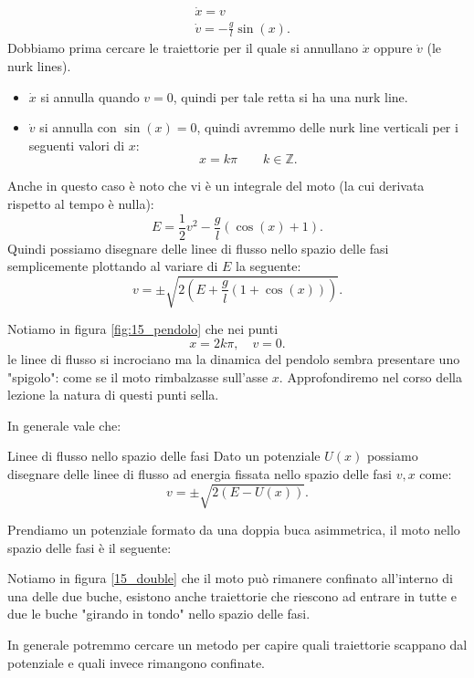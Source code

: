 \begin{exmp}[Pendolo]
    \[\begin{aligned}
	& \dot{x}=v\\
	& \dot{v}=-\frac{g}{l}\sin (x) 
    .\end{aligned}\]
    Dobbiamo prima cercare le traiettorie per il quale si annullano $\dot{x}$ oppure $\dot{v}$ (le nurk lines). 
    \begin{itemize}
        \item $\dot{x}$ si annulla quando $v = 0$, quindi per tale retta si ha una nurk line.
	\item $\dot{v}$ si annulla con $\sin (x) = 0$, quindi avremmo delle nurk line verticali per i seguenti valori di $x$: 
	    \[
		x = k\pi  \qquad k \in \mathbb{Z}
	    .\] 
    \end{itemize}
    Anche in questo caso è noto che vi è un integrale del moto (la cui derivata rispetto al tempo è nulla): 
    \[
	E = \frac{1}{2}v^2 - \frac{g}{l}\left(\cos (x) + 1\right)
    .\] 
    Quindi possiamo disegnare delle linee di flusso nello spazio delle fasi semplicemente plottando al variare di $E$  la seguente:
    \[
	v = \pm \sqrt{2 \left( E + \frac{g}{l}(1 + \cos (x)) \right) } 
    .\] 
    
    Notiamo in figura \ref{fig:15_pendolo} che nei punti 
    \[
        x = 2k\pi, \quad v = 0
    .\] 
    le linee di flusso si incrociano ma la dinamica del pendolo sembra presentare uno "spigolo": come se il moto rimbalzasse sull'asse $x$. Approfondiremo nel corso della lezione la natura di questi punti sella.
\end{exmp}
\noindent
In generale vale che:
\begin{redbox}{Linee di flusso nello spazio delle fasi}
    Dato un potenziale $U(x)$ possiamo disegnare delle linee di flusso ad energia fissata nello spazio delle fasi $v,x$ come:
    \[
	v = \pm \sqrt{2(E-U(x))} 
    .\] 
\end{redbox}
\noindent
\begin{exmp}
Prendiamo un potenziale formato da una doppia buca asimmetrica, il moto nello spazio delle fasi è il seguente:    

Notiamo in figura \ref{15_double} che il moto può rimanere confinato all'interno di una delle due buche, esistono anche traiettorie che riescono ad entrare in tutte e due le buche "girando in tondo" nello spazio delle fasi. 
\end{exmp}
\noindent
In generale potremmo cercare un metodo per capire quali traiettorie scappano dal potenziale e quali invece rimangono confinate.
